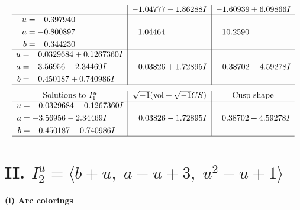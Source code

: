 \documentclass[1p]{elsarticle_modified}
\theoremstyle{definition}
\newcommand{\I}{\sqrt{-1}}
\begin{document}
$$\begin{array}{c|c|c}
 & -1.04777 - 1.86288 I & -1.60939 + 6.09866 I \\ \hline\begin{aligned}
u &= \phantom{-}0.397940\phantom{ +0.000000I} \\
a &= -0.800897\phantom{ +0.000000I} \\
b &= \phantom{-}0.344230\phantom{ +0.000000I}\end{aligned}
 & \phantom{-}1.04464\phantom{ +0.000000I} & \phantom{-}10.2590\phantom{ +0.000000I} \\ \hline\begin{aligned}
u &= \phantom{-}0.0329684 + 0.1267360 I \\
a &= -3.56956 + 2.34469 I \\
b &= \phantom{-}0.450187 + 0.740986 I\end{aligned}
 & \phantom{-}0.03826 + 1.72895 I & \phantom{-}0.38702 - 4.59278 I\\
 \hline 
 \end{array}$$\newpage$$\begin{array}{c|c|c}  
\text{Solutions to }I^u_{1}& \I (\text{vol} + \sqrt{-1}CS) & \text{Cusp shape}\\
 \hline 
\begin{aligned}
u &= \phantom{-}0.0329684 - 0.1267360 I \\
a &= -3.56956 - 2.34469 I \\
b &= \phantom{-}0.450187 - 0.740986 I\end{aligned}
 & \phantom{-}0.03826 - 1.72895 I & \phantom{-}0.38702 + 4.59278 I\\
 \hline 
 \end{array}$$\newpage\newpage\renewcommand{\arraystretch}{1}
\centering \section*{II. $I^u_{2}= \langle b+u,\;a- u+3,\;u^2- u+1 \rangle$}
\flushleft \textbf{(i) Arc colorings}\\
\end{document}

